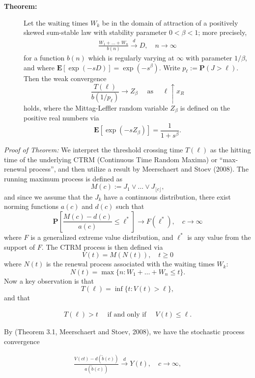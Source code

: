 \documentclass[]{elsarticle} %
\begin{document}
\begin{description}
\item[\textbf{Theorem:}]
Let the waiting times \(W_k\) be in the domain of attraction of a
positively skewed sum-stable law with stability parameter
\(0 < \beta < 1\); more precisely, \begin{align} \label{eq:stability}
\frac{W_1 + \ldots + W_n}{b(n)} \overset{d}{\longrightarrow} D, 
\quad n \to \infty
\end{align} for a function \(b(n)\) which is regularly varying at
\(\infty\) with parameter \(1/\beta\), and where
\(\mathbf E[\exp(-sD)] = \exp(-s^\beta)\). Write
\(p_{\ell} := \mathbf P(J > \ell)\). Then the weak convergence \[
\frac{T(\ell)} {b(1/p_{\ell})} \to Z_\beta \quad \text{ as } \quad \ell \uparrow x_R
\] holds, where the Mittag-Leffler random variable \(Z_\beta\) is
defined on the positive real numbers via \[
\mathbf E[\exp(-sZ_\beta)] = \frac{1}{1+s^\beta}.
\]
\end{description}

\emph{Proof of Theorem:} We interpret the threshold crossing time
\(T(\ell)\) as the hitting time of the underlying CTRM (Continuous Time
Random Maxima) or ``max-renewal process'', and then utilize a result by
Meerschaert and Stoev (2008). The running maximum process is defined as
\[
M(c) := J_1 \vee \ldots \vee J_{\lfloor c \rfloor},
\] and since we assume that the \(J_k\) have a continuous distribution,
there exist norming functions \(a(c)\) and \(d(c)\) such that \[
\mathbf P\left[ \frac{M(c) - d(c)}{a(c)} \le \ell^* \right] 
\longrightarrow F(\ell^*), \quad c \to \infty
\] where \(F\) is a generalized extreme value distribution, and
\(\ell^*\) is any value from the support of \(F\). The CTRM process is
then defined via \[
V(t) = M(N(t)), \quad t \ge 0
\] where \(N(t)\) is the renewal process associated with the waiting
times \(W_k\): \[
N(t) = \max\{n: W_1 + \ldots + W_n \le t\}.
\] Now a key observation is that \[
T(\ell) = \inf\{t: V(t) > \ell\}, 
\] and that

\begin{align}
T(\ell) > t \quad \text{ if and only if } \quad V(t) \le \ell. \label{inverserelat}
\end{align}

By (Theorem 3.1, Meerschaert and Stoev, 2008), we have the stochastic
process convergence

\begin{align}
\frac{V(ct) - d(\tilde b(c))}{a(\tilde b(c))} 
\stackrel{d}{\longrightarrow} Y(t),  \quad c \to \infty, \label{TheoMS}
\end{align}
\end{document}
